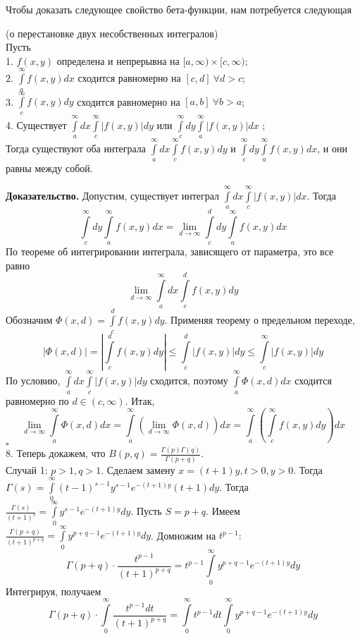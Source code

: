 Чтобы доказать следующее свойство бета-функции, нам потребуется следующая
\begin{theor}
    (о перестановке двух несобственных интегралов)\\
    Пусть\\
    1. $f(x,y)$ определена и непрерывна на $[a,\infty)\times [c,\infty)$;\\
    2. $\int\limits_{a}^{\infty}f(x,y)dx$ сходится равномерно на 
    $[c,d]~\forall d>c$;\\
    3. $\int\limits_{c}^{\infty}f(x,y)dy$ сходится равномерно на 
    $[a,b]~\forall b>a$;\\
    4. Существует $\int\limits_{a}^{\infty}dx \int\limits_{c}^{\infty}
    |f(x,y)|dy$ или  $\int\limits_{c}^{\infty}dy \int\limits_{a}^{\infty}
    |f(x,y)|dx$ ;\\
    Тогда существуют  оба интеграла 
    $\int\limits_{a}^{\infty}dx \int\limits_{c}^{\infty}f(x,y)dy$
    и  $\int\limits_{c}^{\infty}dy \int\limits_{a}^{\infty}f(x,y)dx$,
    и они равны между собой. 
\end{theor}
\textbf{Доказательство.} Допустим, существует интеграл  
$\int\limits_{a}^{\infty}dx \int\limits_{c}^{\infty}|f(x,y)|dx$.
Тогда 
$$\int\limits_{c}^{\infty}dy \int\limits_{a}^{\infty}f(x,y)dx=
\lim\limits_{d \to \infty} \int\limits_{c}^{d} dy \int\limits_{a}^{\infty} 
f(x,y)dx$$
По теореме об интегрировании интеграла, зависящего от параметра, это все равно
$$\lim\limits_{d \to \infty}\int\limits_{a}^{\infty}dx
\int\limits_{c}^{d}f(x,y)dy$$
Обозначим $\Phi(x,d)=\int\limits_{c}^{d}f(x,y)dy$. Применяя теорему о 
предельном переходе, 
$$|\Phi(x,d)|=\left| \int\limits_{c}^{d} f(x,y)dy \right|\leqslant 
\int\limits_{c}^{d} |f(x,y)|dy\leqslant \int\limits_{c}^{\infty}|f(x,y)|dy
$$
По условию, $\int\limits_{a}^{\infty}dx \int\limits_{c}^{\infty}|f(x,y)|dy$ 
сходится, поэтому $\int\limits_{a}^{\infty}\Phi(x,d)dx$ сходится 
равномерно по $d\in (c,\infty)$. Итак,
$$\lim\limits_{d \to \infty}\int\limits_{a}^{\infty}\Phi(x,d)dx=
\int\limits_{a}^{\infty} \left( \lim\limits_{d \to \infty}\Phi(x,d)\right)dx=
\int\limits_{a}^{\infty}\left( \int\limits_{c}^{\infty}f(x,y)dy \right)dx $$
$\square$ \\

8. Теперь докажем, что ${B(p,q)=\frac{\Gamma(p)\Gamma(q)}{\Gamma(p+q)}}$.\\
Случай 1: $p>1,q>1$.  %
Сделаем замену $x=(t+1)y,t>0,y>0$. Тогда
$\Gamma(s)=\int\limits_{0}^{\infty}(t-1)^{s-1}y^{s-1}e^{-(t+1)y}(t+1)dy$.
Тогда $\frac{\Gamma(s)}{(t+1)^s}=\int\limits_{0}^{\infty}y^{s-1}
e^{-(t+1)y}dy$. Пусть $S=p+q$. Имеем
$\frac{\Gamma(p+q)}{(t+1)^{p+q}}=\int\limits_{0}^{\infty}y^{p+q-1}e^{-(t+1)y}
dy$. Домножим на $t^{p-1}$:
$$\Gamma(p+q)\cdot \frac{t^{p-1}}{(t+1)^{p+q}}=t^{p-1}
\int\limits_{0}^{\infty}y^{p+q-1}e^{-(t+1)y}dy$$
Интегрируя, получаем
\begin{equation} \label{gamma_beta}
\Gamma(p+q)\cdot \int\limits_{0}^{\infty} \frac{t^{p-1}dt}{(t+1)^{p+q}}=
\int\limits_{0}^{\infty}t^{p-1}dt \int\limits_{0}^{\infty}y^{p+q-1}
e^{-(t+1)y}dy
\end{equation}


